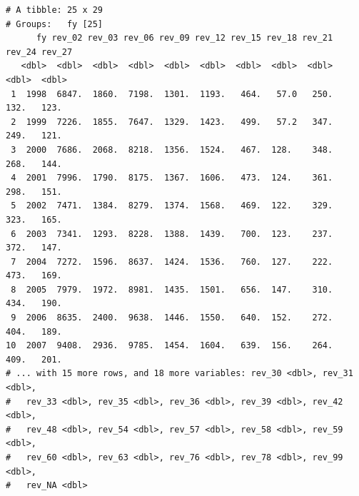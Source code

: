 \documentclass[
  letterpaper,
  DIV=11,
  numbers=noendperiod]{scrreport}
\newenvironment{Shaded}{\begin{snugshade}}{\end{snugshade}}
\newcommand{\AttributeTok}[1]{\textcolor[rgb]{0.40,0.45,0.13}{#1}}
\newcommand{\CommentTok}[1]{\textcolor[rgb]{0.37,0.37,0.37}{#1}}
\newcommand{\FunctionTok}[1]{\textcolor[rgb]{0.28,0.35,0.67}{#1}}
\newcommand{\NormalTok}[1]{\textcolor[rgb]{0.00,0.23,0.31}{#1}}
\newcommand{\OtherTok}[1]{\textcolor[rgb]{0.00,0.23,0.31}{#1}}
\newcommand{\SpecialCharTok}[1]{\textcolor[rgb]{0.37,0.37,0.37}{#1}}
\newcommand{\StringTok}[1]{\textcolor[rgb]{0.13,0.47,0.30}{#1}}
\begin{document}
\begin{verbatim}
# A tibble: 25 x 29
# Groups:   fy [25]
      fy rev_02 rev_03 rev_06 rev_09 rev_12 rev_15 rev_18 rev_21 rev_24 rev_27
   <dbl>  <dbl>  <dbl>  <dbl>  <dbl>  <dbl>  <dbl>  <dbl>  <dbl>  <dbl>  <dbl>
 1  1998  6847.  1860.  7198.  1301.  1193.   464.   57.0   250.   132.   123.
 2  1999  7226.  1855.  7647.  1329.  1423.   499.   57.2   347.   249.   121.
 3  2000  7686.  2068.  8218.  1356.  1524.   467.  128.    348.   268.   144.
 4  2001  7996.  1790.  8175.  1367.  1606.   473.  124.    361.   298.   151.
 5  2002  7471.  1384.  8279.  1374.  1568.   469.  122.    329.   323.   165.
 6  2003  7341.  1293.  8228.  1388.  1439.   700.  123.    237.   372.   147.
 7  2004  7272.  1596.  8637.  1424.  1536.   760.  127.    222.   473.   169.
 8  2005  7979.  1972.  8981.  1435.  1501.   656.  147.    310.   434.   190.
 9  2006  8635.  2400.  9638.  1446.  1550.   640.  152.    272.   404.   189.
10  2007  9408.  2936.  9785.  1454.  1604.   639.  156.    264.   409.   201.
# ... with 15 more rows, and 18 more variables: rev_30 <dbl>, rev_31 <dbl>,
#   rev_33 <dbl>, rev_35 <dbl>, rev_36 <dbl>, rev_39 <dbl>, rev_42 <dbl>,
#   rev_48 <dbl>, rev_54 <dbl>, rev_57 <dbl>, rev_58 <dbl>, rev_59 <dbl>,
#   rev_60 <dbl>, rev_63 <dbl>, rev_76 <dbl>, rev_78 <dbl>, rev_99 <dbl>,
#   rev_NA <dbl>
\end{verbatim}

\begin{Shaded}
\end{Shaded}
\end{document}
